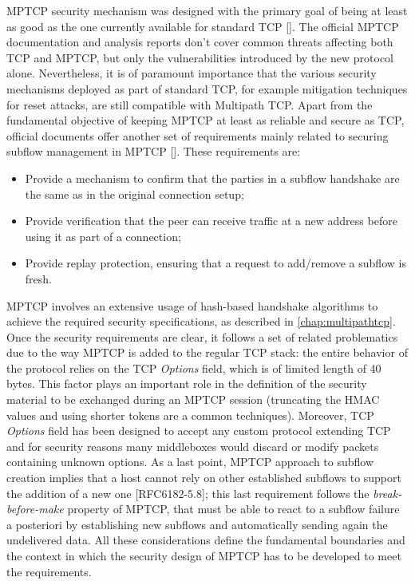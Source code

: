 MPTCP security mechanism was designed with the primary goal of being at least as good as the one currently available for standard TCP []. The official MPTCP documentation and analysis reports don't cover common threats affecting both TCP and MPTCP, but only the vulnerabilities introduced by the new protocol alone. Nevertheless, it is of paramount importance that the various security mechanisms deployed as part of standard TCP, for example mitigation techniques for reset attacks, are still compatible with Multipath TCP. Apart from the fundamental objective of keeping MPTCP at least as reliable and secure as TCP, official documents offer another set of requirements mainly related to securing subflow management in MPTCP []. These requirements are:
\begin{itemize} 
\item Provide a mechanism to confirm that the parties in a subflow handshake are the same as in the original connection setup;
\item Provide verification that the peer can receive traffic at a new address before using it as part of a connection;
\item Provide replay protection, ensuring that a request to add/remove a subflow is fresh.
\end{itemize}

MPTCP involves an extensive usage of hash-based handshake algorithms to achieve the required security specifications, as described in \autoref{chap:multipathtcp}. 
Once the security requirements are clear, it follows a set of related problematics due to the way MPTCP is added to the regular TCP stack: the entire behavior of the protocol relies on the TCP \textit{Options} field, which is of limited length of 40 bytes. This factor plays an important role in the definition of the security material to be exchanged during an MPTCP session (truncating the HMAC values and using shorter tokens are a common techniques). Moreover, TCP \textit{Options} field has been designed to accept any custom protocol extending TCP and for security reasons many middleboxes would discard or modify packets containing unknown options. As a last point, MPTCP approach to subflow creation implies that a host cannot rely on other established subflows to support the addition of a new one [RFC6182-5.8]; this last requirement follows the \textit{break-before-make} property of MPTCP, that must be able to react to a subflow failure a posteriori by establishing new subflows and automatically sending again the undelivered data. All these considerations define the fundamental boundaries and the context in which the security design of MPTCP has to be developed to meet the requirements.

